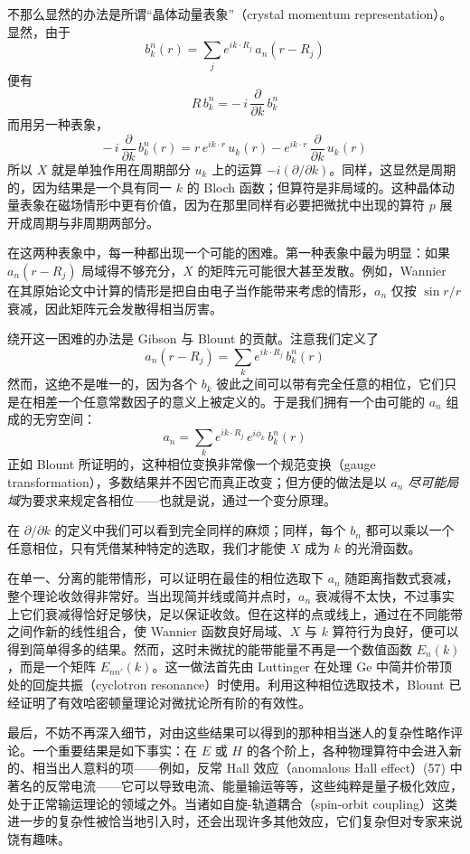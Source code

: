 不那么显然的办法是所谓“晶体动量表象”（crystal momentum representation）。显然，由于
\begin{equation*}
b^n_k(r) = \sum_j e^{ik\cdot R_j}\,a_n(r - R_j)
\end{equation*}
便有
\begin{equation*}
R\,b^n_k = -\,i\,\frac{\partial}{\partial k}\,b^n_k
\end{equation*}
而用另一种表象，
\begin{equation*}
-\,i\,\frac{\partial}{\partial k}\,b^n_k(r) = r\,e^{ik\cdot r}\,u_k(r) - e^{ik\cdot r}\,\frac{\partial}{\partial k}\,u_k(r)
\end{equation*}
所以 $X$ 就是单独作用在周期部分 $u_k$ 上的运算 $-i(\partial/\partial k)$。同样，这显然是周期的，因为结果是一个具有同一 $k$ 的 Bloch 函数；但算符是非局域的。这种晶体动量表象在磁场情形中更有价值，因为在那里同样有必要把微扰中出现的算符 $p$ 展开成周期与非周期两部分。

在这两种表象中，每一种都出现一个可能的困难。第一种表象中最为明显：如果 $a_n(r - R_j)$ 局域得不够充分，$X$ 的矩阵元可能很大甚至发散。例如，Wannier 在其原始论文中计算的情形是把自由电子当作能带来考虑的情形，$a_n$ 仅按 $\sin r/r$ 衰减，因此矩阵元会发散得相当厉害。

绕开这一困难的办法是 Gibson 与 Blount 的贡献。注意我们定义了
\begin{equation*}
a_n(r - R_j) = \sum_k e^{ik\cdot R_j}\,b^n_k(r)
\end{equation*}
然而，这绝不是唯一的，因为各个 $b_k$ 彼此之间可以带有完全任意的相位，它们只是在相差一个任意常数因子的意义上被定义的。于是我们拥有一个由可能的 $a_n$ 组成的无穷空间：
\begin{equation*}
a_n = \sum_k e^{ik\cdot R_j}\,e^{i\phi_k}\,b^n_k(r)
\end{equation*}
正如 Blount 所证明的，这种相位变换非常像一个规范变换（gauge transformation），多数结果并不因它而真正改变；但方便的做法是以 $a_n$ \emph{尽可能局域}为要求来规定各相位——也就是说，通过一个变分原理。

在 $\partial/\partial k$ 的定义中我们可以看到完全同样的麻烦；同样，每个 $b_n$ 都可以乘以一个任意相位，只有凭借某种特定的选取，我们才能使 $X$ 成为 $k$ 的光滑函数。

在单一、分离的能带情形，可以证明在最佳的相位选取下 $a_n$ 随距离指数式衰减，整个理论收敛得非常好。当出现简并线或简并点时，$a_n$ 衰减得不太快，不过事实上它们衰减得恰好足够快，足以保证收敛。但在这样的点或线上，通过在不同能带之间作新的线性组合，使 Wannier 函数良好局域、$X$ 与 $k$ 算符行为良好，便可以得到简单得多的结果。然而，这时未微扰的能带能量不再是一个数值函数 $E_n(k)$，而是一个矩阵 $E_{nn'}(k)$。这一做法首先由 Luttinger 在处理 Ge 中简并价带顶处的回旋共振（cyclotron resonance）时使用。利用这种相位选取技术，Blount 已经证明了有效哈密顿量理论对微扰论所有阶的有效性。

最后，不妨不再深入细节，对由这些结果可以得到的那种相当迷人的复杂性略作评论。一个重要结果是如下事实：在 $E$ 或 $H$ 的各个阶上，各种物理算符中会进入新的、相当出人意料的项——例如，反常 Hall 效应（anomalous Hall effect）(57) 中著名的反常电流——它可以导致电流、能量输运等等，这些纯粹是量子极化效应，处于正常输运理论的领域之外。当诸如自旋-轨道耦合（spin-orbit coupling）这类进一步的复杂性被恰当地引入时，还会出现许多其他效应，它们复杂但对专家来说饶有趣味。
